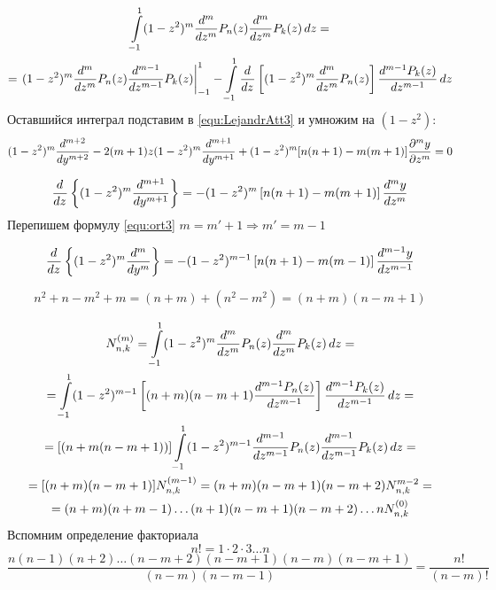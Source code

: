 \begin{multline*}
    \int\limits_{-1}^1 (1 - z^2)^m \frac{d^{m}}{dz^{m}} P_n(z) \frac{d^{m}}{dz^{m}}P_k(z) \,dz = \\ =\left. (1 - z^2)^m \frac{d^{m}}{dz^{m}} P_n (z) \frac{d^{m - 1}}{dz^{m - 1}} P_k(z) \right|_{-1}^1 - \int\limits_{-1}^1 \frac{d^{}}{dz^{}} \left[ (1 - z^2)^m \frac{d^{m}}{dz^{m}} P_n(z)\right] \frac{d^{m - 1}P_k(z)}{dz^{m - 1}} \, dz
\end{multline*}
Оставшийся интеграл подставим в \eqref{equ:LejandrAtt3} и умножим на $(1 - z^2)$:
\[
	(1 - z^2)^m \frac{d^{m + 2}}{dy^{m + 2}} - 2 (m + 1)z (1 - z^2)^m \frac{d^{m + 1}}{dy^{m + 1}} + (1 - z^2)^m [n (n + 1) - m (m + 1)] \frac{\partial^{m}y}{\partial z^{m}} = 0
\]

\begin{equation}
     \frac{d^{}}{dz^{}} \left\{ (1 - z^2)^m \frac{d^{m + 1}}{dy^{m + 1}} \right\} = - (1 - z^2)^m \left[ n(n + 1) - m(m +1) \right] \frac{d^{m}y}{dz^{m}}
	 \label{equ:ort3}
\end{equation}
Перепишем формулу \eqref{equ:ort3} $m = m' + 1 \Rightarrow m' = m - 1$

\begin{equation*}
     \frac{d^{}}{dz^{}} \left\{ (1 - z^2)^m \frac{d^{m}}{dy^{m}} \right\} = - (1 - z^2)^{m-1} \left[ n(n + 1) - m(m - 1) \right] \frac{d^{m - 1}y}{dz^{m - 1}}
\end{equation*}

\[
    n^2 + n - m^2 + m = (n + m) + (n^2 - m^2) = (n + m)(n - m + 1)
\]

\begin{multline*}
    N_{n,k}^{(m)} = \int\limits_{-1}^1 (1 - z^2)^{m} \frac{d^{m}}{dz^{m}} P_n(z ) \frac{d^{m}}{dz^{m}} P_k (z) \, dz =\\= \int\limits_{-1}^1 (1 - z^2)^{m - 1} \left[(n + m) (n - m + 1) \frac{d^{m - 1}P_n(z)}{dz^{m - 1}}\right] \frac{d^{m - 1}P_k(z)}{dz^{m - 1}}\, dz = \\ = [(n + m (n - m + 1))] \int\limits_{-1}
^1 (1 - z^2)^{m - 1} \frac{d^{m - 1}}{dz^{m - 1}} P_n(z) \frac{d^{m - 1}}{dz^{m - 1}} P_k(z) \, dz = \\ = [(n + m)(n - m + 1)]N_{n,k}^{(m - 1)} = (n + m) (n - m + 1) (n - m +2) N_{n, k}^{m - 2} = \\ = (n + m)(n + m - 1)\ldots (n + 1) (n - m + 1) (n - m + 2)\ldots n N_{n,k}^{(0)}
\end{multline*}
Вспомним определение факториала
\[
	n! = 1 \cdot 2 \cdot 3 \ldots n
\]
\[
   \frac{n(n - 1)(n + 2) \ldots (n - m + 2) (n - m + 1) (n - m) (n - m + 1)}{(n - m)(n - m - 1)} = \frac{n!}{(n - m)!}
\]


